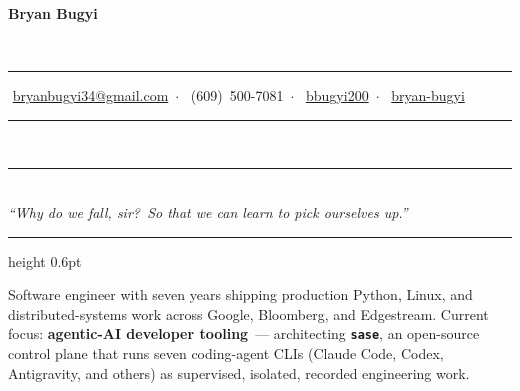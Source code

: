 \documentclass[letterpaper,11pt]{article}
\newcommand{\resheading}[1]{%
  \par\addvspace{14pt}%
  \noindent
  {\sffamily\bfseries\color{batgold}\fontsize{11pt}{13pt}\selectfont%
   \textls*[150]{\MakeUppercase{#1}}}%
  \hspace{0.6em}%
  {\color{batgold}\leaders\hrule height 0.6pt\hfill\kern0pt}%
  \par\nobreak\addvspace{4pt}%
}
\newcommand{\midsep}{\,\textcolor{batstone}{$\cdot$}\,}
\begin{document}
\noindent
{\sffamily\bfseries\fontsize{28pt}{30pt}\selectfont\color{batblack}Bryan Bugyi}%
\hfill
\begin{minipage}[b]{2.4in}
  \raggedleft
  {\sffamily\color{batink}\fontsize{10pt}{13pt}\selectfont\scshape%
   \\[1pt]
   }
\end{minipage}

\vspace{6pt}
\noindent\textcolor{batgold}{\rule{\textwidth}{0.8pt}}
\vspace{2pt}

\noindent
{\sffamily\color{batink}\fontsize{10pt}{12pt}\selectfont%
\textcolor{batgold}{\faEnvelope}\,\,\href{mailto:bryanbugyi34@gmail.com}{bryanbugyi34@gmail.com}%
\midsep
\textcolor{batgold}{\faPhone}\,\,(609)~500-7081%
\midsep
\textcolor{batgold}{\faGithub}\,\,\href{https://github.com/bbugyi200}{bbugyi200}%
\midsep
\textcolor{batgold}{\faLinkedin}\,\,\href{https://linkedin.com/in/bryan-bugyi}{bryan-bugyi}%
}

\vspace{14pt}
\begin{center}
{\color{batink}\rule[0.55ex]{2.0in}{0.3pt}}\,\,\raisebox{-0.15ex}{\textcolor{batgoldlight}{\large\faMask}}\,\,{\color{batink}\rule[0.55ex]{2.0in}{0.3pt}}\\[5pt]
{\itshape\color{batink}\fontsize{10.5pt}{13pt}\selectfont``Why do we fall, sir?\ So that we can learn to pick ourselves up.''}
\end{center}

\resheading{Dossier}
Software engineer with seven years shipping production Python, Linux, and distributed-systems work across Google, Bloomberg, and Edgestream. Current focus: \textbf{agentic-AI developer tooling}~--- architecting \textbf{\texttt{sase}}, an open-source control plane that runs seven coding-agent CLIs (Claude Code, Codex, Antigravity, and others) as supervised, isolated, recorded engineering work.
\end{document}
